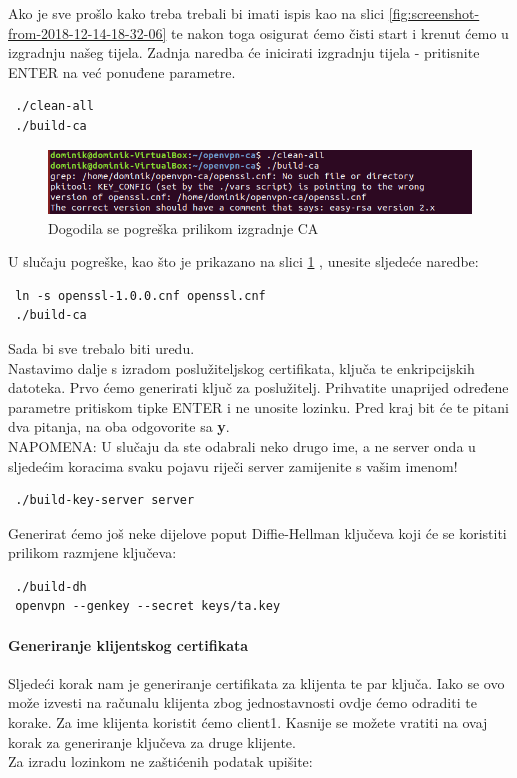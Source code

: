 Ako je sve prošlo kako treba trebali bi imati ispis kao na slici \ref{fig:screenshot-from-2018-12-14-18-32-06} te nakon toga osigurat ćemo čisti start i krenut ćemo u izgradnju našeg tijela. Zadnja naredba će inicirati izgradnju tijela - pritisnite ENTER na već ponuđene parametre.
\begin{lstlisting}
 ./clean-all
 ./build-ca
\end{lstlisting}

\begin{figure}[h]
	\centering
	\includegraphics[width=0.7\linewidth]{"slike/OpenVPN/Screenshot from 2018-12-14 18-40-25"}
	\caption[Dogodila se pogreška prilikom izgradnje CA]{Dogodila se pogreška prilikom izgradnje CA}
	\label{fig:screenshot-from-2018-12-14-18-40-25}
\end{figure}


U slučaju pogreške, kao što je prikazano na slici \ref{fig:screenshot-from-2018-12-14-18-40-25} , unesite sljedeće naredbe:
\begin{lstlisting}
 ln -s openssl-1.0.0.cnf openssl.cnf
 ./build-ca
\end{lstlisting}
Sada bi sve trebalo biti uredu.\\

Nastavimo dalje s izradom poslužiteljskog certifikata, ključa te enkripcijskih datoteka. Prvo ćemo generirati ključ za poslužitelj. Prihvatite unaprijed određene parametre pritiskom tipke ENTER i ne unosite lozinku. Pred kraj bit će te pitani dva pitanja, na oba odgovorite sa \textbf{y}.\\
NAPOMENA: U slučaju da ste odabrali neko drugo ime, a ne server onda u sljedećim koracima svaku pojavu riječi server zamijenite s vašim imenom! 
\begin{lstlisting}
 ./build-key-server server
\end{lstlisting}
Generirat ćemo još neke dijelove poput Diffie-Hellman ključeva koji će se koristiti prilikom razmjene ključeva:
\begin{lstlisting}
 ./build-dh
 openvpn --genkey --secret keys/ta.key
\end{lstlisting}

\bigbreak
\paragraph*{Generiranje klijentskog certifikata}
\hfill \smallbreak
Sljedeći korak nam je generiranje certifikata za klijenta te par ključa. Iako se ovo može izvesti na računalu klijenta zbog jednostavnosti ovdje ćemo odraditi te korake. Za ime klijenta koristit ćemo client1. Kasnije se možete vratiti na ovaj korak za generiranje ključeva za druge klijente.\\
Za izradu lozinkom ne zaštićenih podatak upišite:


